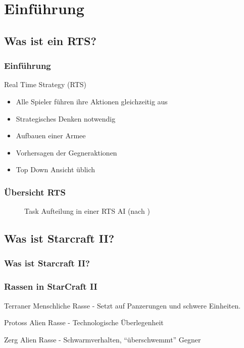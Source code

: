 \section{Einführung}
 \subsection{Was ist ein RTS?}
  \begin{frame}
	\frametitle{Einführung}
	\begin{block}{Real Time Strategy (RTS)}
		\begin{itemize}
			\item Alle Spieler führen ihre Aktionen gleichzeitig aus
			\item Strategisches Denken notwendig
			\item Aufbauen einer Armee			
			\item Vorhersagen der Gegneraktionen
			\item Top Down Ansicht üblich
		\end{itemize}
	\end{block}
 \end{frame}
 
 \begin{frame}
 	\frametitle{Übersicht RTS}
 	\begin{figure}
	 		
	 	\caption{Task Aufteilung in einer RTS AI (nach \cite{synnaeve.2012})}
 	\end{figure}

 \end{frame}
  
  \subsection{Was ist Starcraft II?}
  
  
  
  \begin{frame}
  	\frametitle{Was ist Starcraft II?}
  \end{frame}
  
  \begin{frame}
  	\frametitle{Rassen in StarCraft II}
  	\begin{block}{Terraner}
  		Menschliche Rasse - Setzt auf Panzerungen und schwere Einheiten.
  	\end{block}
  	\begin{block}{Protoss}
  		Alien Rasse - Technologische Überlegenheit
 	\end{block}
 	\begin{block}{Zerg}
 		Alien Rasse - Schwarmverhalten, \enquote{überschwemmt} Gegner
	\end{block}
  \end{frame}